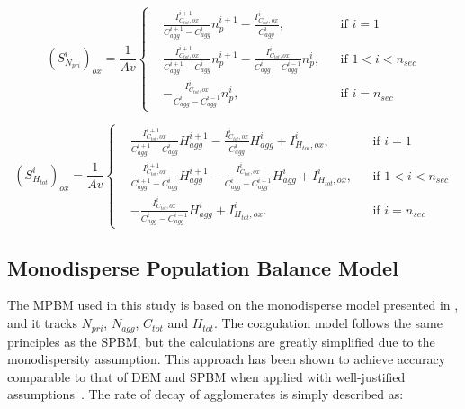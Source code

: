 \begin{equation}
	\left(S^i_{N_{pri}}\right)_{ox}=
	\frac{1}{Av}
	\left\{
	\begin{aligned}
		&\frac{I^{i+1}_{C_{tot},ox}}{C^{i+1}_{agg}-C^{i}_{agg}}n^{i+1}_p
		-
		\frac{I^{i}_{C_{tot},ox}}{C^{i}_{agg}},
		&&
		\text{if } i = 1
		\\
		&\frac{I^{i+1}_{C_{tot},ox}}{C^{i+1}_{agg}-C^{i}_{agg}}n^{i+1}_p
		-
		\frac{I^{i}_{C_{tot},ox}}{C^{i}_{agg}-C^{i-1}_{agg}}n^{i}_p,
		&&
		\text{if } 1 < i < n_{sec}
		\\
		&
		-
		\frac{I^{i}_{C_{tot},ox}}{C^{i}_{agg}-C^{i-1}_{agg}}n^{i}_p,
		&&\text{if } i=n_{sec}
	\end{aligned}
	\right.
	\label{eqn:S_Npri_oxsect}
\end{equation}

\begin{equation}
	\left(S^i_{H_{tot}}\right)_{ox}=
	\frac{1}{Av}
	\left\{
	\begin{aligned}
		&\frac{I^{i+1}_{C_{tot},ox}}{C^{i+1}_{agg}-C^{i}_{agg}}H^{i+1}_{agg}
		-
		\frac{I^{i}_{C_{tot},ox}}{C^{i}_{agg}}H^{i}_{agg}
		+ I^{i}_{H_{tot}, ox},
		&&
		\text{if } i = 1
		\\
		&\frac{I^{i+1}_{C_{tot},ox}}{C^{i+1}_{agg}-C^{i}_{agg}}H^{i+1}_{agg}
		-
		\frac{I^{i}_{C_{tot},ox}}{C^{i}_{agg}-C^{i-1}_{agg}}H^{i}_{agg}
		+ I^{i}_{H_{tot}, ox},
		&&
		\text{if } 1 < i < n_{sec}
		\\
		&
		-
		\frac{I^{i}_{C_{tot},ox}}{C^{i}_{agg}-C^{i-1}_{agg}}H^{i}_{agg}
		+ I^{i}_{H_{tot}, ox}.
		&&\text{if } i=n_{sec}
	\end{aligned}
	\right.
	\label{eqn:S_Htot_oxsect}
\end{equation}


\subsection{Monodisperse Population Balance Model}
\label{sec:mpbm}
The MPBM used in this study is based on the monodisperse model presented in \citep{kholghy2021surface}, and it tracks $N_{pri}$, $N_{agg}$, $C_{tot}$ and $H_{tot}$. The coagulation model follows the same principles as the SPBM, but the calculations are greatly simplified due to the monodispersity assumption. This approach has been shown to achieve accuracy comparable to that of DEM and SPBM when applied with well-justified assumptions~\citep{Kelesidis2017Flame, kelesidis2019estimating}. The rate of decay of agglomerates is simply described as:

